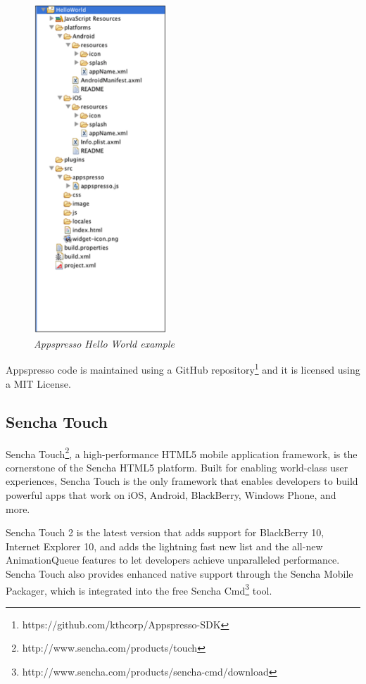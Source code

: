 \documentclass[a4paper,12pt]{book}
\begin{document}
\begin{figure}[H]
    \centering
    \includegraphics[width=5cm, keepaspectratio]{img/appspresso.png}
    \caption{\textit{Appspresso Hello World example}}
 \end{figure}
 
Appspresso code is maintained using a GitHub repository\footnote{https://github.com/kthcorp/Appspresso-SDK} and it is licensed using a MIT License.
 
\subsection{Sencha Touch}
\label{Sencha Touch}

Sencha Touch\footnote{http://www.sencha.com/products/touch}, a high-performance HTML5 mobile application framework, is the cornerstone of the Sencha HTML5 platform. Built for enabling world-class user experiences, Sencha Touch is the only framework that enables developers to build powerful apps that work on iOS, Android, BlackBerry, Windows Phone, and more.

Sencha Touch 2 is the latest version that adds support for BlackBerry 10, Internet Explorer 10, and adds the lightning fast new list and the all-new AnimationQueue features to let developers achieve unparalleled performance. Sencha Touch also provides enhanced native support through the Sencha Mobile Packager, which is integrated into the free Sencha Cmd\footnote{http://www.sencha.com/products/sencha-cmd/download} tool. 
\end{document}
